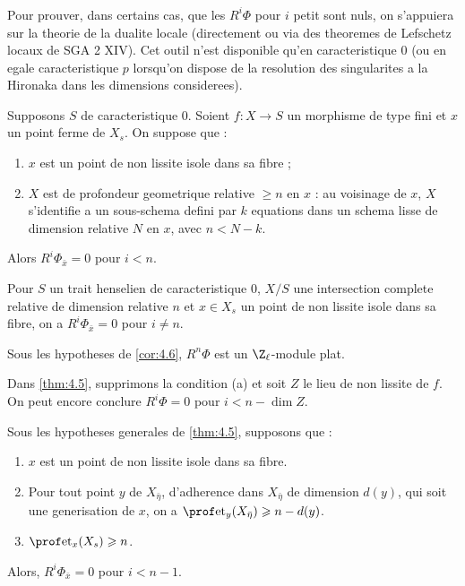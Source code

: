 \subsubsection{}
\label{subsubsec:4.4}
Pour prouver, dans certains cas, que les $R^i \Phi$ pour $i$ petit sont nuls, on s'appuiera sur la theorie de la dualite locale (directement ou via des theoremes de Lefschetz locaux de SGA 2 XIV). Cet outil n'est disponible qu'en caracteristique $0$ (ou en egale caracteristique $p$ lorsqu'on dispose de la resolution des singularites a la Hironaka dans les dimensions considerees).

\begin{theorem}
\label{thm:4.5}
Supposons $S$ de caracteristique $0$. Soient $f: X \to S$ un morphisme de type fini et $x$ un point ferme de $X_s$. On suppose que :
\begin{enumerate}[label=(\alph*)]
\item $x$ est un point de non lissite isole dans sa fibre ;
\item $X$ est de profondeur geometrique relative $\geqslant n$ en $x$ : au voisinage de $x$, $X$ s'identifie a un sous-schema defini par $k$ equations dans un schema lisse de dimension relative $N$ en $x$, avec $n < N - k$.
\end{enumerate}
Alors $R^i \Phi_{\bar{x}} = 0$ pour $i < n$.
\end{theorem}

\begin{corollary}
\label{cor:4.6}
Pour $S$ un trait henselien de caracteristique $0$, $X/S$ une intersection complete relative de dimension relative $n$ et $x \in X_s$ un point de non lissite isole dans sa fibre, on a $R^i \Phi_{\bar{x}} = 0$ pour $i \neq n$.
\end{corollary}

\begin{corollary}
\label{cor:4.7}
Sous les hypotheses de \ref{cor:4.6}, $R^n \Phi$ est un $\Z_\ell$-module plat.
\end{corollary}

\begin{variante}
\label{var:4.8}
Dans \ref{thm:4.5}, supprimons la condition (a) et soit $Z$ le lieu de non lissite de $f$. On peut encore conclure $R^i \Phi = 0$ pour $i < n - \dim Z$.
\end{variante}

\begin{proposition}
\label{prop:4.10}
Sous les hypotheses generales de \ref{thm:4.5}, supposons que :
\begin{enumerate}[label=(\alph*)]
\item $x$ est un point de non lissite isole dans sa fibre.
\item Pour tout point $y$ de $X_{\bar{\eta}}$, d'adherence dans $X_{\bar{\eta}}$ de dimension $d(y)$, qui soit une generisation de $x$, on a $\prof\mathrm{et}_y(X_{\bar{\eta}}) \geqslant n - d(y)$.
\item $\prof\mathrm{et}_x(X_s) \geqslant n$.
\end{enumerate}
Alors, $R^i \Phi_{\bar{x}} = 0$ pour $i < n - 1$.
\end{proposition}

